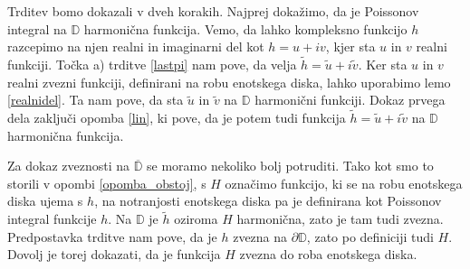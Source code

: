 \documentclass[mat1, tisk]{fmfdelo}
\begin{document}
     \begin{dokaz}
        Trditev bomo dokazali v dveh korakih. Najprej dokažimo, da je Poissonov integral na $\mathbb{D}$ harmonična funkcija.
        Vemo, da lahko kompleksno funkcijo $h$ razcepimo na njen realni in imaginarni del kot $h = u + iv$, kjer sta $u$ in $v$ realni funkciji. 
        Točka a) trditve \ref{lastpi} nam pove, da velja $\widetilde{h} = \widetilde{u} + i \widetilde{v}$.
        Ker sta $u$ in $v$ realni zvezni funkciji, definirani na robu enotskega diska, lahko uporabimo lemo \ref{realnidel}. Ta nam pove, da sta $\widetilde{u}$ in $\widetilde{v}$ na $\mathbb{D}$ harmonični funkciji. 
        Dokaz prvega dela zaključi opomba \ref{lin}, ki pove, da je potem tudi funkcija $\widetilde{h} = \widetilde{u} + i \widetilde{v}$ na $\mathbb{D}$ harmonična funkcija.
        
        Za dokaz zveznosti na $\overline{\mathbb{D}}$ se moramo nekoliko bolj potruditi. Tako kot smo to storili v opombi \ref{opomba_obstoj}, s $H$ označimo funkcijo, ki se na robu enotskega diska ujema s $h$, na notranjosti enotskega diska pa je definirana kot Poissonov integral funkcije $h$. 
        Na  $\mathbb{D}$ je $\widetilde{h}$ oziroma $H$ harmonična, zato je tam tudi zvezna. Predpostavka trditve nam pove, da je $h$ zvezna na $\partial \mathbb{D}$, zato po definiciji tudi $H$. 
        Dovolj je torej dokazati, da je funkcija $H$ zvezna do roba enotskega diska.
        

\end{dokaz}
\end{document}

